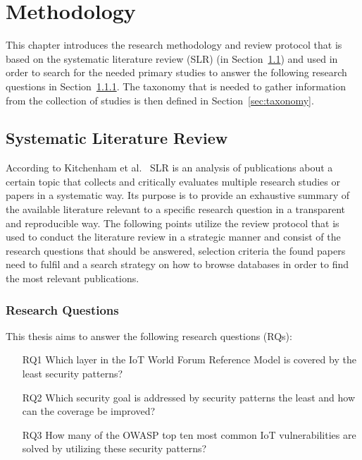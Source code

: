 
\chapter{Methodology}\label{ch:methodology}
This chapter introduces the research methodology and review protocol that is based on the systematic literature review (SLR) (in Section~\ref{sec:slr}) and used in order to search for the needed primary studies to answer the following research questions in Section~\ref{sec:research_questions}. The taxonomy that is needed to gather information from the collection of studies is then defined in Section~\ref{sec:taxonomy}.


\section{Systematic Literature Review}\label{sec:slr}
According to Kitchenham et al.~\cite{Kitchenham2007} SLR is an analysis of publications about a certain topic that collects and critically evaluates multiple research studies or papers in a systematic way. Its purpose is to provide an exhaustive summary of the available literature relevant to a specific research question in a transparent and reproducible way. The following points utilize the review protocol that is used to conduct the literature review in a strategic manner and consist of the research questions that should be answered, selection criteria the found papers need to fulfil and a search strategy on how to browse databases in order to find the most relevant publications.

\subsection{Research Questions}\label{sec:research_questions}
This thesis aims to answer the following research questions (RQs):

\begin{enumerate}
	\item[RQ1] Which layer in the IoT World Forum Reference Model is covered by the least security patterns?
	\item[RQ2] Which security goal is addressed by security patterns the least and how can the coverage be improved?
	\item[RQ3] How many of the OWASP top ten most common IoT vulnerabilities are solved by utilizing these security patterns?
\end{enumerate}

